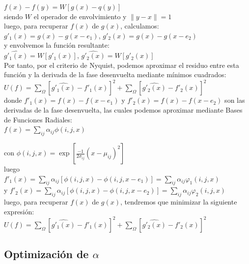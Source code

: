 \documentclass[10pt,journal,compsoc]{styles/IEEEtran}
\begin{document}
$f(x)-f(y)=W[g(x)-q(y)]$\\

siendo $W$ el operador de envolvimiento y $\parallel y-x \parallel=1$\\

luego, para recuperar $f(x)$ de $g(x)$, calculamos:\\

$g'_1(x)=g(x)-g(x-e_1)$, $g'_2(x)=g(x)-g(x-e_2)$\\

y envolvemos la función resultante:\\

$\widehat{g'_1(x)}=W[g'_1(x)]$, $\widehat{g'_2(x)}=W[g'_2(x)]$\\

Por tanto, por el criterio de Nyquist, podemos aproximar el residuo entre esta función y la derivada de la fase desenvuelta mediante mínimos cuadrados:\\

$U(f)=\sum \limits_{\Omega} [\widehat{g'_1(x)}-f'_1(x)]^2+\sum \limits_{\Omega} [\widehat{g'_2(x)}-f'_2(x)]^2$\\

donde $f'_1(x)=f(x)-f(x-e_1)$ y $f'_2(x)=f(x)-f(x-e_2)$ son las derivadas de la fase desenvuelta, las cuales podemos aproximar mediante Bases de Funciones Radiales:\\

$f(x)=\sum \limits_{ij} \alpha_{ij} \phi(i,j,x)$

con $\phi(i,j,x)=\exp[\frac{-1}{2\sigma_{ij}}(x-\mu_{ij})^2]$\\

luego\\
$f'_1(x)=\sum \limits_{ij}\alpha_{ij}[\phi(i,j,x)-\phi(i,j,x-e_1)]=\sum \limits_{ij}\alpha_{ij}\varphi_1 (i,j,x)$\\
y $f'_2(x)=\sum \limits_{ij}\alpha_{ij}[\phi(i,j,x)-\phi(i,j,x-e_2)]=\sum \limits_{ij}\alpha_{ij}\varphi_2 (i,j,x)$\\

luego, para recuperar $f(x)$ de $g(x)$, tendremos que minimizar la siguiente expresión:\\

$U(f)=\sum \limits_{\Omega} [\widehat{g'_1(x)}-f'_1(x)]^2+\sum \limits_{\Omega} [\widehat{g'_2(x)}-f'_2(x)]^2$\\

\subsection{Optimización de $\alpha$}
\end{document}
